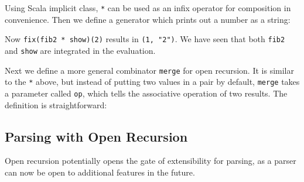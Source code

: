 Using Scala implicit class, \lstinline{*} can be used as an infix operator for composition in convenience.
Then we define a generator which prints out a number as a string:

Now \lstinline{fix(fib2 * show)(2)} results in \lstinline{(1, "2")}. We have seen that both \lstinline{fib2} and \lstinline{show} are integrated in the evaluation.

Next we define a more general combinator \lstinline{merge} for open recursion. It is similar to the \lstinline{*} above, but instead of putting two values in a pair by default, \lstinline{merge} takes a parameter called \lstinline{op}, which tells the associative operation of two results. The definition is straightforward:



\subsection{Parsing with Open Recursion}\label{subsec:parsingwithopen}

Open recursion potentially opens the gate of extensibility for
parsing, as a parser can now be open to additional features in the future.


